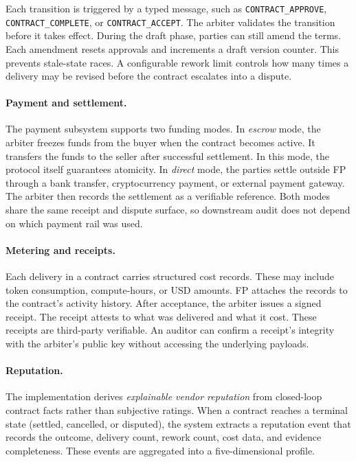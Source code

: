 \documentclass{llmxive}
\begin{document}
\noindent Each transition is triggered by a typed message, such as \texttt{CONTRACT\_APPROVE}, \texttt{CONTRACT\_COMPLETE}, or \texttt{CONTRACT\_ACCEPT}. The arbiter validates the transition before it takes effect. During the draft phase, parties can still amend the terms. Each amendment resets approvals and increments a draft version counter. This prevents stale-state races. A configurable rework limit controls how many times a delivery may be revised before the contract escalates into a dispute.

\paragraph{Payment and settlement.}
The payment subsystem supports two funding modes. In \emph{escrow} mode, the arbiter freezes funds from the buyer when the contract becomes active. It transfers the funds to the seller after successful settlement. In this mode, the protocol itself guarantees atomicity.
In \emph{direct} mode, the parties settle outside FP through a bank transfer, cryptocurrency payment, or external payment gateway. The arbiter then records the settlement as a verifiable reference. Both modes share the same receipt and dispute surface, so downstream audit does not depend on which payment rail was used.

\paragraph{Metering and receipts.}
Each delivery in a contract carries structured cost records. These may include token consumption, compute-hours, or USD amounts. FP attaches the records to the contract's activity history. After acceptance, the arbiter issues a signed receipt. The receipt attests to what was delivered and what it cost.
These receipts are third-party verifiable. An auditor can confirm a receipt's integrity with the arbiter's public key without accessing the underlying payloads.

\paragraph{Reputation.}
The implementation derives \emph{explainable vendor reputation} from
closed-loop contract facts rather than subjective ratings.  When a
contract reaches a terminal state (settled, cancelled, or disputed), the
system extracts a reputation event that records the outcome, delivery
count, rework count, cost data, and evidence completeness.  These events
are aggregated into a five-dimensional profile.
\end{document}
